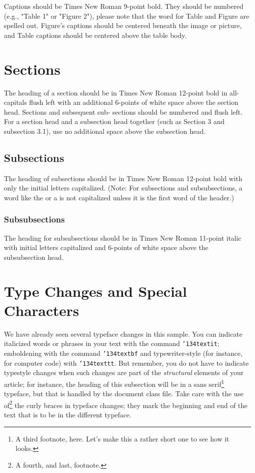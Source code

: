 \documentclass[acmtog, authorversion]{acmart}
\begin{document}
Captions should be Times New Roman 9-point bold.  They should be numbered (e.g., "Table 1" or "Figure 2"), please note that the word for Table and Figure are spelled out. Figure's captions should be centered beneath the image or picture, and Table captions should be centered above the table body.

\section{Sections}
The heading of a section should be in Times New Roman 12-point bold in all-capitals flush left with an additional 6-points of white space above the section head.  Sections and subsequent sub- sections should be numbered and flush left. For a section head and a subsection head together (such as Section 3 and subsection 3.1), use no additional space above the subsection head.

\subsection{Subsections}
The heading of subsections should be in Times New Roman 12-point bold with only the initial letters capitalized. (Note: For subsections and subsubsections, a word like the or a is not capitalized unless it is the first word of the header.)

\subsubsection{Subsubsections}
The heading for subsubsections should be in Times New Roman 11-point italic with initial letters capitalized and 6-points of white space above the subsubsection head.




\section{Type Changes and Special Characters}
We have already seen several typeface changes in this sample.  You
can indicate italicized words or phrases in your text with the
command \texttt{{\char'134}textit}; emboldening with the command
\texttt{{\char'134}textbf} and typewriter-style (for instance, for
computer code) with \texttt{{\char'134}texttt}.  But remember, you
do not have to indicate typestyle changes when such changes are
part of the \textit{structural} elements of your article; for
instance, the heading of this subsection will be in a sans
serif\footnote{A third footnote, here. Let's make this a rather
short one to see how it looks.} typeface, but that is handled by
the document class file. Take care with the use of\footnote{A
fourth, and last, footnote.} the curly braces in typeface changes;
they mark the beginning and end of the text that is to be in the
different typeface.
\end{document}
